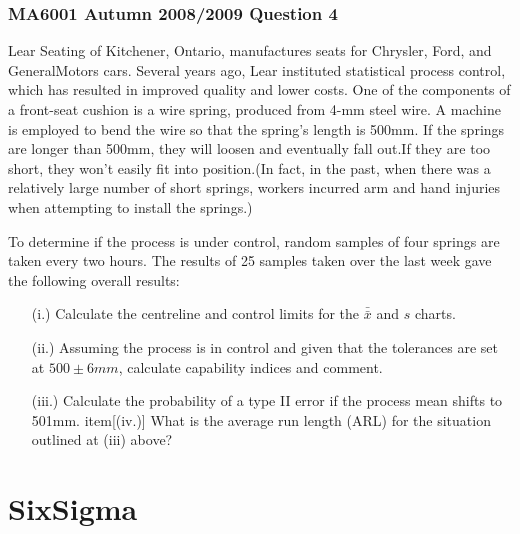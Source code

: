 \documentclass[]{report}
\begin{document}
\subsection{MA6001 Autumn 2008/2009 Question 4}


Lear Seating of Kitchener, Ontario, manufactures seats for Chrysler, Ford, and GeneralMotors cars. Several years ago, Lear instituted statistical process control, which has	resulted in improved quality and lower costs.  One of the components of a front-seat cushion is a wire spring, produced from 4-mm steel wire.  A machine is employed to 	bend the wire so that the spring's length is 500mm.  If the springs are longer than 500mm, they will loosen and eventually fall out.If they are too short, they won't easily fit into position.(In fact, in the past, when there was a relatively large number of short springs, workers incurred arm and hand injuries when attempting to install the 	
springs.)

To determine if the process is under control, random samples of four springs are taken every two hours.
The results of 25 samples taken over the last week gave the following overall results:

\begin{itemize}
	\item[(i.)]	Calculate the centreline and control limits for the $\bar{\bar{x}}$ and  $s$  charts.	
	
	\item[(ii.)] Assuming the process is in control and given that the tolerances are set at
	$500 \pm 6mm$, calculate capability indices and comment.	      
	
	\item[(iii.)] Calculate the probability of a type II error if the process
	mean shifts to 501mm.                                                                      
	item[(iv.)] What is the average run length (ARL) for the situation outlined at (iii)
	above?	
\end{itemize}


\newpage
\chapter{SixSigma}
\end{document}
